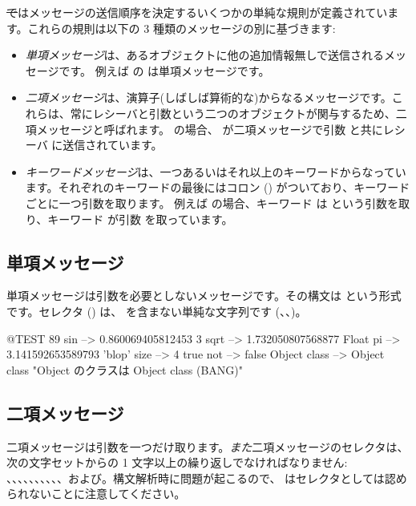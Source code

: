 \documentclass[a4paper,10pt,twoside]{book}
\begin{document}
\st ではメッセージの送信順序を決定するいくつかの単純な規則が定義されています。これらの規則は以下の 3 種類のメッセージの別に基づきます:
\begin{itemize}
\item \emph{単項メッセージ}は、あるオブジェクトに他の追加情報無しで送信されるメッセージです。 例えば  の  は単項メッセージです。
\item  \emph{二項メッセージ}は、演算子(しばしば算術的な)からなるメッセージです。これらは、常にレシーバと引数という二つのオブジェクトが関与するため、二項メッセージと呼ばれます。 の場合、\ct{+} が二項メッセージで引数  と共にレシーバ  に送信されています。
\item  \emph{キーワードメッセージ}は、一つあるいはそれ以上のキーワードからなっています。それぞれのキーワードの最後にはコロン (\ct{:}) がついており、キーワードごとに一つ引数を取ります。
例えば  の場合、キーワード  は  という引数を取り、キーワード  が引数  を取っています。
\end{itemize}

\subsection{単項メッセージ}
単項メッセージは引数を必要としないメッセージです。その構文は  という形式です。セレクタ () は、\ct{:} を含まない単純な文字列です (\eg {}、、)。
\begin{code}{@TEST}
89 sin           --> 0.860069405812453
3 sqrt           --> 1.732050807568877
Float pi         --> 3.141592653589793
'blop' size     --> 4
true not        --> false
Object class --> Object class  "Object のクラスは Object class (BANG)"
\end{code}


\subsection{二項メッセージ} 
二項メッセージは引数を一つだけ取ります。\emph{また}二項メッセージのセレクタは、次の文字セットからの 1 文字以上の繰り返しでなければなりません: \ct{+}、\ct{-}、\ct{*}、\ct{/}、\ct{\&}、\ct{=}、\ct{>}、\ct{|}、\ct{<}、\ct{\~}、および。構文解析時に問題が起こるので、\ct{--} はセレクタとしては認められないことに注意してください。
\end{document}

